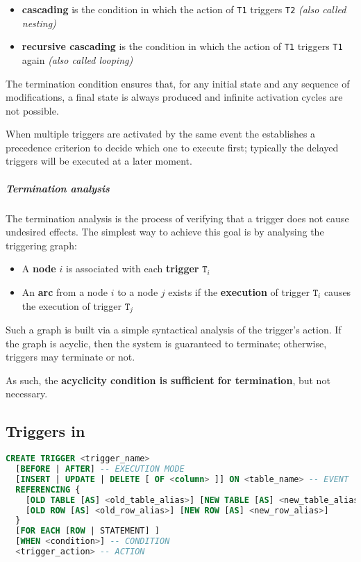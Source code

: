 \documentclass[english]{article}
\begin{document}
\begin{itemize}
  \item \textbf{cascading} is the condition in which the action of \texttt{T1} triggers \texttt{T2} \textit{(also called nesting)}
  \item \textbf{recursive cascading} is the condition in which the action of \texttt{T1} triggers \texttt{T1} again \textit{(also called looping)}
\end{itemize}

The termination condition ensures that, for any initial state and any sequence of modifications, a final state is always produced and infinite activation cycles are not possible.

\bigskip
When multiple triggers are activated by the same event the \dbms establishes a precedence criterion to decide which one to execute first;
typically the delayed triggers will be executed at a later moment.

\subparagraph*{Termination analysis}
The termination analysis is the process of verifying that a trigger does not cause undesired effects.
The simplest way to achieve this goal is by analysing the triggering graph:

\begin{itemize}
  \item A \textbf{node} \(i\) is associated with each \textbf{trigger} \(\texttt{T}_i\)
  \item An \textbf{arc} from a node \(i\) to a node \(j\) exists if the \textbf{execution} of trigger \(\texttt{T}_i\) causes the execution of trigger \(\texttt{T}_j\)
\end{itemize}

Such a graph is built via a simple syntactical analysis of the trigger's action.
If the graph is acyclic, then the system is guaranteed to terminate;
otherwise, triggers may terminate or not.

As such, the \textbf{acyclicity condition is sufficient for termination}, but not necessary.

\subsection{Triggers in \sql}

\begin{minipage}{\textwidth}
  \bigskip
  \begin{lstlisting}[language=SQL, caption={Trigger Syntax}, label={lst:trigger-syntax}]
CREATE TRIGGER <trigger_name>
  [BEFORE | AFTER] -- EXECUTION MODE
  [INSERT | UPDATE | DELETE [ OF <column> ]] ON <table_name> -- EVENT
  REFERENCING {
    [OLD TABLE [AS] <old_table_alias>] [NEW TABLE [AS] <new_table_alias>] |
    [OLD ROW [AS] <old_row_alias>] [NEW ROW [AS] <new_row_alias>]
  }
  [FOR EACH [ROW | STATEMENT] ]
  [WHEN <condition>] -- CONDITION
  <trigger_action> -- ACTION
\end{lstlisting}
\end{minipage}
\end{document}
